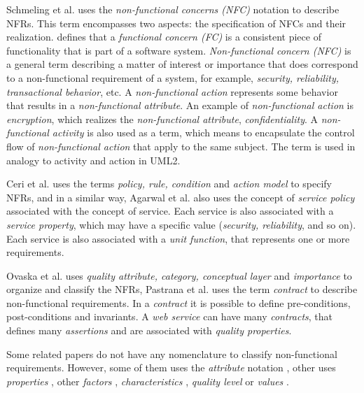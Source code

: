 \documentclass{sig-alternate}
\begin{document}
Schmeling et al.\cite{SchmelingCM11} uses the 
\textit{non-functional concerns (NFC)} notation to describe NFRs. This term
encompasses two aspects: the specification of NFCs and their realization.
\cite{SchmelingCM11} defines that a \textit{functional concern (FC)} is a
consistent piece of functionality that is part of a software system.
\textit{Non-functional concern (NFC)} is a general term describing a matter of interest or importance that does correspond
to a non-functional requirement of a system, for example, \textit{security,
reliability, transactional behavior}, etc. A \textit{non-functional action} represents some
behavior that results in a \textit{non-functional attribute}. An example of
\textit{non-functional action} is \textit{encryption}, which realizes the \textit{non-functional attribute},
\textit{confidentiality}. A \textit{non-functional activity} is also used as a
term, which means to encapsulate the control flow of \textit{non-functional
action} that apply to the same subject. The term is used in analogy to activity
and action in UML2.

Ceri et al.\cite{CeriDMF07} uses the terms \textit{policy, rule,
condition} and \textit{action model} to specify NFRs, and in a similar way,
Agarwal et al.\cite{AgarwalLS09} also uses the concept of \textit{service
policy} associated with the concept of service. Each service is also associated
with a \textit{service property}, which may have a specific value
(\textit{security, reliability}, and so on). Each service is also associated
with a \textit{unit function}, that represents one or more
requirements.

Ovaska et al.\cite{OvaskaEHPA10} uses
\textit{quality attribute, category, conceptual layer} and \textit{importance}
to organize and classify the NFRs, Pastrana et al.\cite{PastranaPK11} uses
the term \textit{contract} to describe non-functional requirements. In a
\textit{contract} it is possible to define pre-conditions, post-conditions and
invariants. A \textit{web service} can have many \textit{contracts}, that
defines many \textit{assertions} and are associated with \textit{quality
properties}. 




Some related papers do not have any
nomenclature to classify non-functional requirements. However, some of them uses
the \textit{attribute} notation \cite{ZhangPSP05,BasinDL06,JeongCL09}, other
uses \textit{properties} \cite{Fabra2011}, other \textit{factors}
\cite{MohantyRP10,GutierrezRF10}, \textit{characteristics}
\cite{DiamadopoulouMPS08}, \textit{quality level} \cite{ModicaTV09} or
\textit{values} \cite{ThissenW06,BasinDL06}.
\end{document}

